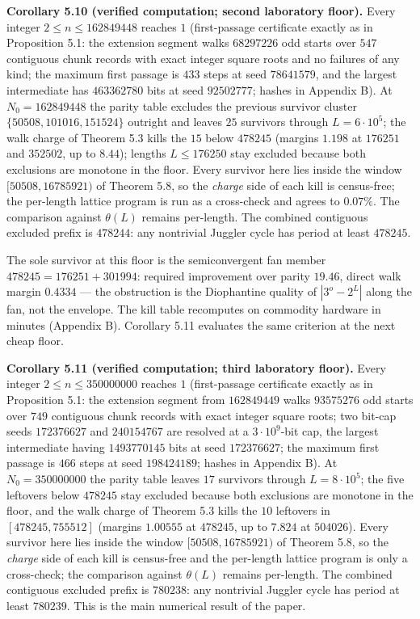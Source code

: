 \documentclass[12pt]{article}
\begin{document}
\textbf{Corollary 5.10 (verified computation; second laboratory floor).}
Every integer \(2\le n\le 162849448\) reaches \(1\) (first-passage
certificate exactly as in Proposition 5.1: the extension segment walks
\(68297226\) odd starts over \(547\) contiguous chunk records with exact
integer square roots and no failures of any kind; the maximum first
passage is \(433\) steps at seed \(78641579\), and the largest
intermediate has \(463362780\) bits at seed \(92502777\); hashes in
Appendix B). At \(N_0=162849448\) the parity table excludes the previous
survivor cluster \(\{50508,101016,151524\}\) outright and leaves \(25\)
survivors through \(L=6\cdot 10^5\); the walk charge of Theorem 5.3
kills the \(15\) below \(478245\) (margins \(1.198\) at \(176251\) and
\(352502\), up to \(8.44\)); lengths \(L\le 176250\) stay excluded
because both exclusions are monotone in the floor. Every survivor here
lies inside the window \([50508,16785921)\) of Theorem 5.8, so the
\emph{charge} side of each kill is census-free; the per-length lattice
program is run as a cross-check and agrees to \(0.07\%\). The comparison
against \(\theta(L)\) remains per-length. The combined contiguous
excluded prefix is \(478244\): any nontrivial Juggler cycle has period
at least \(478245\).

The sole survivor at this floor is the semiconvergent fan member
\(478245=176251+301994\): required improvement over parity \(19.46\),
direct walk margin \(0.4334\) --- the obstruction is the Diophantine
quality of \(|3^o-2^L|\) along the fan, not the envelope. The kill table
recomputes on commodity hardware in minutes (Appendix B). Corollary 5.11
evaluates the same criterion at the next cheap floor.

\textbf{Corollary 5.11 (verified computation; third laboratory floor).}
Every integer \(2\le n\le 350000000\) reaches \(1\) (first-passage
certificate exactly as in Proposition 5.1: the extension segment from
\(162849449\) walks \(93575276\) odd starts over \(749\) contiguous
chunk records with exact integer square roots; two bit-cap seeds
\(172376627\) and \(240154767\) are resolved at a \(3\cdot 10^9\)-bit
cap, the largest intermediate having \(1493770145\) bits at seed
\(172376627\); the maximum first passage is \(466\) steps at seed
\(198424189\); hashes in Appendix B). At \(N_0=350000000\) the parity
table leaves \(17\) survivors through \(L=8\cdot 10^5\); the five
leftovers below \(478245\) stay excluded because both exclusions are
monotone in the floor, and the walk charge of Theorem 5.3 kills the
\(10\) leftovers in \([478245,755512]\) (margins \(1.00555\) at
\(478245\), up to \(7.824\) at \(504026\)). Every survivor here lies
inside the window \([50508,16785921)\) of Theorem 5.8, so the
\emph{charge} side of each kill is census-free and the per-length
lattice program is only a cross-check; the comparison against
\(\theta(L)\) remains per-length. The combined contiguous excluded
prefix is \(780238\): any nontrivial Juggler cycle has period at least
\(780239\). This is the main numerical result of the paper.
\end{document}
